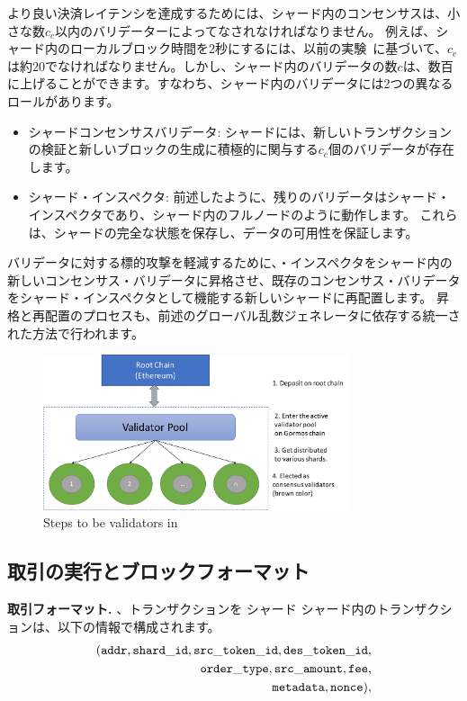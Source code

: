 より良い決済レイテンシを達成するためには、シャード内のコンセンサスは、小さな数$c_c$以内のバリデーターによってなされなければなりません。 例えば、シャード内のローカルブロック時間を2秒にするには、以前の実験~\cite{elastico}に基づいて、$c_c$は約20でなければなりません。しかし、シャード内のバリデータの数$c$は、数百に上げることができます。すなわち、シャード内のバリデータには2つの異なるロールがあります。

\begin{itemize}
\item シャードコンセンサスバリデータ: シャードには、新しいトランザクションの検証と新しいブロックの生成に積極的に関与する$c_c$個のバリデータが存在します。
\item シャード・インスペクタ: 前述したように、残りのバリデータはシャード・インスペクタであり、シャード内のフルノードのように動作します。 これらは、シャードの完全な状態を保存し、データの可用性を保証します。
\end{itemize}

バリデータに対する標的攻撃を軽減するために、・インスペクタをシャード内の新しいコンセンサス・バリデータに昇格させ、既存のコンセンサス・バリデータをシャード・インスペクタとして機能する新しいシャードに再配置します。 昇格と再配置のプロセスも、前述のグローバル乱数ジェネレータに依存する統一された方法で行われます。

\begin{figure}[t]
  \centering
  \includegraphics[width=0.8\textwidth]{images/validator}
  \caption{Steps to be validators in \codename}
  \label{fig:validator}
\end{figure}

\subsection{取引の実行とブロックフォーマット}

\textbf{取引フォーマット.} 、トランザクションを
シャード シャード内のトランザクションは、以下の情報で構成されます。
\begin{align*}
({\mathtt{addr}}, {\mathtt{shard\_id}}, {\mathtt{src\_token\_id}}, {\mathtt{des\_token\_id}}, \\ {\mathtt{order\_type}}, {\mathtt{src\_amount}}, {\mathtt{fee}}, \\ {\mathtt{metadata}}, {\mathtt{nonce}}),
\end{align*}

